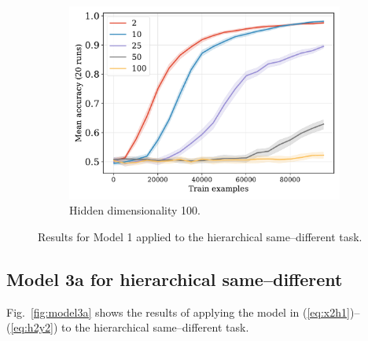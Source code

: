 \documentclass[12pt]{article}
\newcommand{\Figref}[1]{Fig.~\ref{#1}}
\newcommand{\eg}[1]{(\ref{#1})}
\newcommand{\dasheg}[2]{\eg{#1}--\eg{#2}}
\begin{document}
\begin{figure}[H]
  \begin{subfigure}{0.45\linewidth}
    \includegraphics[width=1\textwidth]{fig/flatpremack-h1-train_size-embed_dim-hidden_dim=100.pdf}
    \caption{Hidden dimensionality 100.}
  \end{subfigure}
  \caption{Results for Model 1 applied to the hierarchical same--different task.}
  \label{fig:model1:premack}
\end{figure}



\subsection{Model 3a for hierarchical same--different}

\Figref{fig:model3a} shows the results of applying the model in \dasheg{eq:x2h1}{eq:h2y2} to the hierarchical same--different task.
\end{document}
